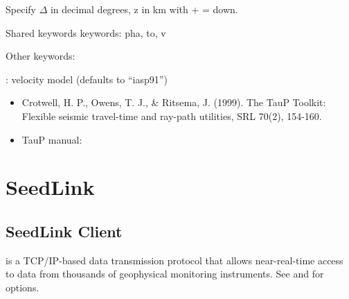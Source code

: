 \documentclass[letterpaper,11pt,english]{sphinxmanual}
\begin{document}
Specify \(\Delta\) in decimal degrees, z in km with + = down.

\begin{DUlineblock}{0em}
\item[] Shared keywords keywords: pha, to, v
\item[] Other keywords:
\item[] : velocity model (defaults to “iasp91”)
\end{DUlineblock}

\begin{itemize}
\item {} 
Crotwell, H. P., Owens, T. J., \& Ritsema, J. (1999). The TauP Toolkit: Flexible seismic travel-time and ray-path utilities, SRL 70(2), 154-160.

\item {} 
TauP manual: 

\end{itemize}


\section{SeedLink}
\label{\detokenize{src/Web/seedlink:seedlink}}\label{\detokenize{src/Web/seedlink::doc}}

\subsection{SeedLink Client}
\label{\detokenize{src/Web/seedlink:seedlink-client}}
 is a
TCP/IP-based data transmission protocol that allows near-real-time access to
data from thousands of geophysical monitoring instruments. See
{\hyperref[\detokenize{src/Appendices/keywords:dkw}]{}} and {\hyperref[\detokenize{src/Appendices/web_syntax:cid}]{}} for options.


\begin{fulllineitems}
\end{fulllineitems}



\begin{fulllineitems}
\end{fulllineitems}
\end{document}
